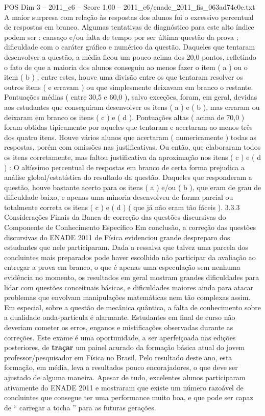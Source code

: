 \begin{textsample}{POS Dim 3 – 2011\_c6 – Score 1.00 – 2011\_c6/enade\_2011\_fis\_063ad74c0e.txt}
A maior surpresa com relação às respostas dos alunos foi o excessivo percentual de respostas em branco.
Algumas tentativas de diagnóstico para este alto índice podem ser : cansaço e/ou falta de tempo por ser última questão da prova ; dificuldade com o caráter gráfico e numérico da questão.
Daqueles que tentaram desenvolver a questão, a média ficou um pouco acima dos 20,0 pontos, refletindo o fato de que a maioria dos alunos conseguiu ao menos fazer o item ( a ) ou o item ( b ) ; entre estes, houve uma divisão entre os que tentaram resolver os outros itens ( e erravam ) ou que simplesmente deixavam em branco o restante.
Pontuações médias ( entre 30,5 e 60,0 ), salvo exceções, foram, em geral, devidas aos estudantes que conseguiram desenvolver os itens ( a ) e ( b ), mas erraram ou deixaram em branco os itens ( c ) e ( d ).
Pontuações altas ( acima de 70,0 ) foram obtidas tipicamente por aqueles que tentaram e acertaram ao menos três dos quatro itens.
Houve vários alunos que acertaram ( numericamente ) todas as respostas, porém com omissões nas justificativas.
Ou então, que elaboraram todos os itens corretamente, mas faltou justificativa da aproximação nos itens ( c ) e ( d ) : O altíssimo percentual de respostas em branco de certa forma prejudica a análise global/estatística do resultado da questão.
Daqueles que responderam a questão, houve bastante acerto para os itens ( a ) e/ou ( b ), que eram de grau de dificuldade baixo, e apenas uma minoria desenvolveu de forma parcial ou totalmente correta os itens ( c ) e ( d ) ( que já não eram tão fáceis ). 3.3.3 Considerações Finais da Banca de correção das questões discursivas do Componente de Conhecimento Específico Em conclusão, a correção das questões discursivas do ENADE 2011 de Física evidenciou grande despreparo dos estudantes que nele participaram.
Dada a ressalva que talvez uma parcela dos concluintes mais preparados pode haver escolhido não participar da avaliação ao entregar a prova em branco, o que é apenas uma especulação sem nenhuma evidência no momento, os resultados em geral mostram grandes dificuldades para lidar com questões conceituais básicas, e dificuldades maiores ainda para atacar problemas que envolvam manipulações matemáticas nem tão complexas assim.
Em especial, sobre a questão de mecânica quântica, a falta de conhecimento sobre a dualidade onda-partícula é alarmante.
Estudantes em final de curso não deveriam cometer os erros, enganos e mistificações observadas durante as correções.
Este exame é uma oportunidade, a ser aperfeiçoada nas edições posteriores, de \textbf{traçar} um painel acurado da formação básica atual do jovem professor/pesquisador em Física no Brasil.
Pelo resultado deste ano, esta formação, em média, leva a resultados pouco encorajadores, o que deve ser ajustado de alguma maneira.
Apesar de tudo, excelentes alunos participaram ativamente do ENADE 2011 e mostraram que existe um número razoável de concluintes que consegue ter uma performance muito boa, e que pode ser capaz de “ carregar a tocha ” para as futuras gerações.

\end{textsample}
